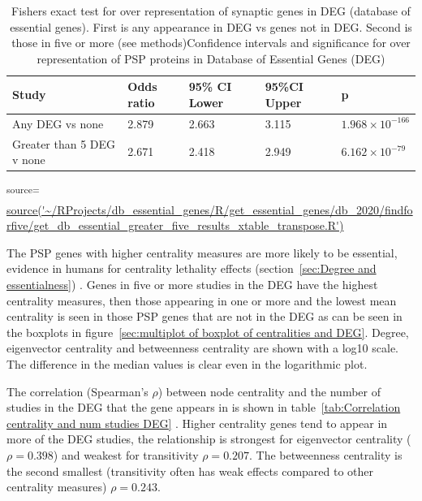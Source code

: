 \begin{table}[ht]
\centering
\begin{tabular}{lllll}

  \toprule
Study & Odds ratio & 95\% CI Lower & 95\%CI Upper & p \\ 
  \midrule
Any DEG vs none & 2.879 & 2.663 & 3.115 & $1.968 \times 10^{-166}$\vspace{1mm} \\ 
  Greater than 5 DEG v none & 2.671 & 2.418 & 2.949 & $6.162 \times 10^{-79}$\vspace{1mm} \\ 
   \bottomrule
\end{tabular}
\caption{Fishers exact test for over representation of synaptic genes in DEG (database of essential genes). First is any appearance in DEG vs genes not in DEG. Second is those in five or more (see methods)Confidence intervals and significance for over representation of PSP proteins in Database of Essential Genes (DEG)}
\tiny\textsuperscript{source=} \url{source('~/RProjects/db_essential_genes/R/get_essential_genes/db_2020/findforfive/get_db_essential_greater_five_results_xtable_transpose.R')}
\label{tab:Fishers exact results DEG}
\end{table}





The PSP genes with higher centrality measures are more likely to be essential, evidence in humans for centrality lethality effects (section~\ref{sec:Degree and essentialness}) . Genes in five or more studies in the DEG have the highest centrality measures, then those appearing in one or more and the lowest mean centrality is seen in those PSP genes that are not in the DEG  as can be seen in the boxplots in figure~\ref{sec:multiplot of boxplot of centralities and DEG}. Degree, eigenvector centrality and betweenness centrality are shown with a log10 scale. The difference in the median values is clear even in the logarithmic plot. 


The correlation (Spearman's $\rho$) between node centrality and the number of studies in the DEG that the gene appears in is shown in table~\ref{tab:Correlation centrality and num studies DEG} . Higher centrality genes tend to appear in more of the DEG studies, the relationship is strongest for eigenvector centrality ($\rho=0.398$) and weakest for transitivity $\rho=0.207$. The betweenness centrality is the second smallest (transitivity often has weak effects compared to other centrality measures) $\rho=0.243$.





